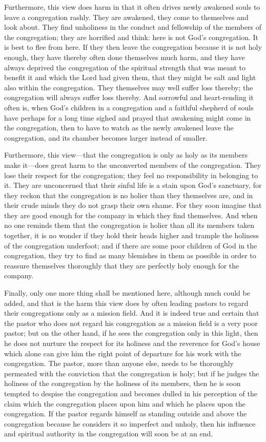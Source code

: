 Furthermore, this view does harm in that it often drives newly awakened souls to leave a congregation rashly. They are awakened, they come to themselves and look about. They find unholiness in the conduct and fellowship of the members of the congregation; they are horrified and think: here is not God’s congregation. It is best to flee from here. If they then leave the congregation because it is not holy enough, they have thereby often done themselves much harm, and they have always deprived the congregation of the spiritual strength that was meant to benefit it and which the Lord had given them, that they might be salt and light also within the congregation. They themselves may well suffer loss thereby; the congregation will always suffer loss thereby. And sorrowful and heart-rending it often is, when God’s children in a congregation and a faithful shepherd of souls have perhaps for a long time sighed and prayed that awakening might come in the congregation, then to have to watch as the newly awakened leave the congregation, and its chamber becomes larger instead of smaller.

Furthermore, this view—that the congregation is only as holy as its members make it—does great harm to the unconverted members of the congregation. They lose their respect for the congregation; they feel no responsibility in belonging to it. They are unconcerned that their sinful life is a stain upon God’s sanctuary, for they reckon that the congregation is no holier than they themselves are, and in their crude minds they do not grasp their own shame. For they soon imagine that they are good enough for the company in which they find themselves. And when no one reminds them that the congregation is holier than all its members taken together, it is no wonder if they hold their heads higher and trample the holiness of the congregation underfoot; and if there are some poor children of God in the congregation, they try to find as many blemishes in them as possible in order to reassure themselves thoroughly that they are perfectly holy enough for the company.

Finally, only one more thing shall be mentioned here, although much could be added, and that is the harm this view does by often leading pastors to regard their congregations only as a mission field. And it is indeed true and certain that the pastor who does not regard his congregation as a mission field is a very poor pastor; but on the other hand, if he sees the congregation only in this light, then he does not nurture the respect for its holiness and the reverence for God’s house which alone can give him the right point of departure for his work with the congregation. The pastor, more than anyone else, needs to be thoroughly permeated with the conviction that the congregation is holy; but if he judges the holiness of the congregation by the holiness of its members, then he is soon tempted to despise the congregation and becomes dulled in his perception of the claim which the congregation places upon him and which he places upon the congregation. If the pastor regards himself as standing outside and above the congregation because he considers it so imperfect and unholy, then his influence and spiritual authority in the congregation will soon be at an end.

